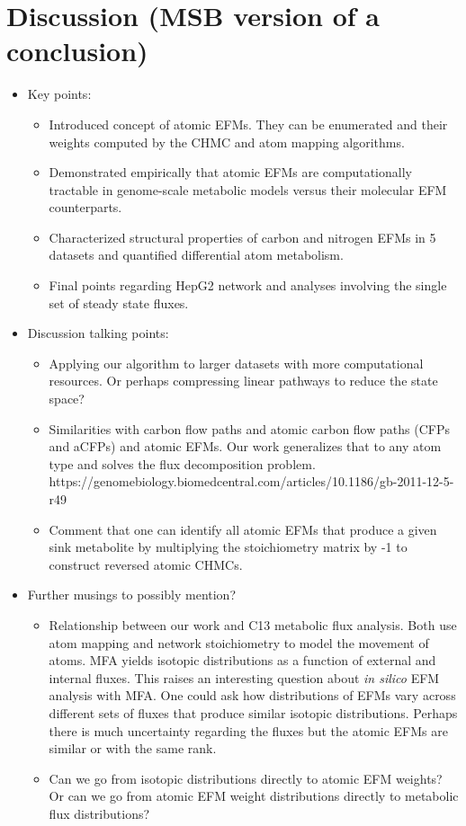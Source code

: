 \documentclass[11pt]{article}
\begin{document}
\section{Discussion (MSB version of a conclusion)}

\begin{itemize}
    \item Key points:
    \begin{itemize}
        \item Introduced concept of atomic EFMs. They can be enumerated and their weights computed by the CHMC and atom mapping algorithms.
        \item Demonstrated empirically that atomic EFMs are computationally tractable in genome-scale metabolic models versus their molecular EFM counterparts.
        \item Characterized structural properties of carbon and nitrogen EFMs in 5 datasets and quantified differential atom metabolism.
        \item Final points regarding HepG2 network and analyses involving the single set of steady state fluxes.
    \end{itemize}
    \item Discussion talking points:
    \begin{itemize}
        \item Applying our algorithm to larger datasets with more computational resources. Or perhaps compressing linear pathways to reduce the state space?
        \item Similarities with carbon flow paths and atomic carbon flow paths (CFPs and aCFPs) and atomic EFMs. Our work generalizes that to any atom type and solves the flux decomposition problem. https://genomebiology.biomedcentral.com/articles/10.1186/gb-2011-12-5-r49
        \item Comment that one can identify all atomic EFMs that produce a given sink metabolite by multiplying the stoichiometry matrix by -1 to construct reversed atomic CHMCs.
    \end{itemize}
    \item Further musings to possibly mention?
    \begin{itemize}
        \item Relationship between our work and C13 metabolic flux analysis. Both use atom mapping and network stoichiometry to model the movement of atoms. MFA yields isotopic distributions as a function of external and internal fluxes. This raises an interesting question about \textit{in silico} EFM analysis with MFA. One could ask how distributions of EFMs vary across different sets of fluxes that produce similar isotopic distributions. Perhaps there is much uncertainty regarding the fluxes but the atomic EFMs are similar or with the same rank.
        \item Can we go from isotopic distributions directly to atomic EFM weights? Or can we go from atomic EFM weight distributions directly to metabolic flux distributions?
    \end{itemize}
\end{itemize}
\end{document}
